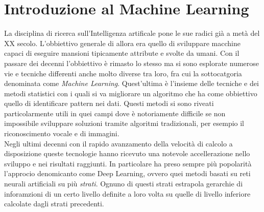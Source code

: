 \documentclass[12pt,a4paper,openright,twoside]{report}
\begin{document}


\chapter{Introduzione al Machine Learning}                %
\lhead[\fancyplain{}{\bfseries\thepage}]{\fancyplain{}{\bfseries\rightmark}}
La disciplina di ricerca sull'Intelligenza artificale pone le sue radici già a metà del XX secolo. L'obbiettivo generale di allora era quello di sviluppare macchine capaci di eseguire mansioni tipicamente attribute e svolte da umani. 
Con il passare dei decenni l'obbiettivo è rimasto lo stesso ma si sono esplorate numerose vie e tecniche differenti anche molto diverse tra loro, fra cui la sottocatgoria denominata come \emph{Machine Learning}. Quest'ultima è l'insieme delle tecniche e dei metodi statistici con i quali si va migliorare un algoritmo che ha come obbiettivo quello di identificare pattern nei dati. 
Questi metodi si sono riveati particolarmente utili in quei campi dove è notoriamente difficile se non impossibile sviluppare soluzioni tramite algoritmi tradizionali, per esempio il riconoscimento vocale e di immagini.\\
Negli ultimi decenni con il rapido avanzamento della velocità di calcolo a disposizione queste tecnologie hanno ricevuto una notevole accellerazione nello sviluppo e nei risultati raggiunti. 
In particolare ha preso sempre più popolarità l'approcio denomicanto come Deep Learning, ovvero quei metodi basati su reti neurali artificiali su più \emph{strati}. Ognuno di questi strati estrapola gerarchie di inforamzioni di un certo livello definite a loro volta su quelle di livello inferiore calcolate dagli strati precedenti.
\end{document}
